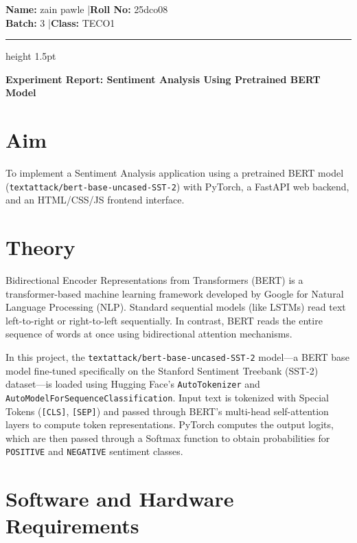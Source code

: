 \documentclass[12pt,a4paper]{article}
\begin{document}
\begin{center}
    \textbf{Name:} zain pawle \quad|\quad \textbf{Roll No:} 25dco08 \\
    \textbf{Batch:} 3 \quad|\quad \textbf{Class:} TECO1
\end{center}
\vspace{0.2cm}
\hrule height 1.5pt
\vspace{0.5cm}

\begin{center}
    {\Large \textbf{Experiment Report: Sentiment Analysis Using Pretrained BERT Model}} \\[0.2cm]
    \date{\today}
\end{center}
\vspace{0.3cm}

\section{Aim}
To implement a Sentiment Analysis application using a pretrained BERT model (\texttt{textattack/bert-base-uncased-SST-2}) with PyTorch, a FastAPI web backend, and an HTML/CSS/JS frontend interface.

\section{Theory}
Bidirectional Encoder Representations from Transformers (BERT) is a transformer-based machine learning framework developed by Google for Natural Language Processing (NLP). Standard sequential models (like LSTMs) read text left-to-right or right-to-left sequentially. In contrast, BERT reads the entire sequence of words at once using bidirectional attention mechanisms.

In this project, the \texttt{textattack/bert-base-uncased-SST-2} model—a BERT base model fine-tuned specifically on the Stanford Sentiment Treebank (SST-2) dataset—is loaded using Hugging Face's \texttt{AutoTokenizer} and \texttt{AutoModelForSequenceClassification}. Input text is tokenized with Special Tokens (\texttt{[CLS]}, \texttt{[SEP]}) and passed through BERT's multi-head self-attention layers to compute token representations. PyTorch computes the output logits, which are then passed through a Softmax function to obtain probabilities for \texttt{POSITIVE} and \texttt{NEGATIVE} sentiment classes.

\section{Software and Hardware Requirements}
\end{document}

